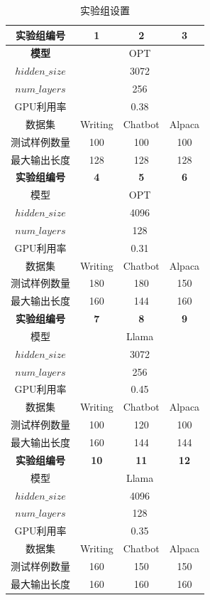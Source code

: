 \documentclass[a4paper, nosysfonts]{hpcchina}
\begin{document}
\begin{table}[H]
  \centering
  \caption{实验组设置}
  \label{实验组设置}
  \begin{tabular}{|c|c|c|c|} \hline
    \textbf{实验组编号} & \textbf{1} & \textbf{2} & \textbf{3} \\ \hline
    \textbf{模型} & \multicolumn{3}{|c|}{OPT} \\ \hline
    $hidden\_size$ & \multicolumn{3}{|c|}{3072} \\ \hline
    $num\_layers$ & \multicolumn{3}{|c|}{256} \\ \hline
    GPU利用率 & \multicolumn{3}{|c|}{0.38} \\ \hline
    数据集 & Writing & Chatbot & Alpaca \\ \hline
    测试样例数量 & 100 & 100 & 100 \\ \hline
    最大输出长度 & 128 & 128 & 128 \\ \hline
    \textbf{实验组编号} & \textbf{4} & \textbf{5} & \textbf{6} \\ \hline
    模型 & \multicolumn{3}{|c|}{OPT} \\ \hline
    $hidden\_size$ & \multicolumn{3}{|c|}{4096} \\ \hline
    $num\_layers$ & \multicolumn{3}{|c|}{128} \\ \hline
    GPU利用率 & \multicolumn{3}{|c|}{0.31} \\ \hline
    数据集 & Writing & Chatbot & Alpaca \\ \hline
    测试样例数量 & 180 & 180 & 150 \\ \hline
    最大输出长度 & 160 & 144 & 160 \\ \hline
    \textbf{实验组编号} & \textbf{7} & \textbf{8} & \textbf{9} \\ \hline
    模型 & \multicolumn{3}{|c|}{Llama} \\ \hline
    $hidden\_size$ & \multicolumn{3}{|c|}{3072} \\ \hline
    $num\_layers$ & \multicolumn{3}{|c|}{256} \\ \hline
    GPU利用率 & \multicolumn{3}{|c|}{0.45} \\ \hline
    数据集 & Writing & Chatbot & Alpaca \\ \hline
    测试样例数量 & 100 & 120 & 100 \\ \hline
    最大输出长度 & 160 & 144 & 144 \\ \hline
    \textbf{实验组编号} & \textbf{10} & \textbf{11} & \textbf{12} \\ \hline
    模型 & \multicolumn{3}{|c|}{Llama} \\ \hline
    $hidden\_size$ & \multicolumn{3}{|c|}{4096} \\ \hline
    $num\_layers$ & \multicolumn{3}{|c|}{128} \\ \hline
    GPU利用率 & \multicolumn{3}{|c|}{0.35} \\ \hline
    数据集 & Writing & Chatbot & Alpaca \\ \hline
    测试样例数量 & 160 & 150 & 150 \\ \hline
    最大输出长度 & 160 & 160 & 160 \\ \hline
  \end{tabular}
\end{table}
\end{document}
